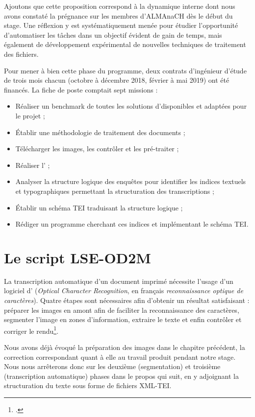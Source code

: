 Ajoutons que cette proposition correspond à la dynamique interne dont nous avons constaté la prégnance sur les membres d'ALMAnaCH dès le début du stage. Une réflexion y est systématiquement menée pour étudier l'opportunité d'automatiser les tâches dans un objectif évident de gain de temps, mais également de développement expérimental de nouvelles techniques de traitement des fichiers.

Pour mener à bien cette phase du programme, deux contrats d'ingénieur d'étude de trois mois chacun (octobre à décembre 2018, février à mai 2019) ont été financés. La fiche de poste comptait sept missions :

\begin{itemize}
    \item Réaliser un benchmark de toutes les solutions d'\ocr disponibles et adaptées pour le projet ;
    \item Établir une méthodologie de traitement des documents ;
    \item Télécharger les images, les contrôler et les pré-traiter ;
    \item Réaliser l'\ocr{} ;
    \item Analyser la structure logique des enquêtes pour identifier les indices textuels et typographiques permettant la structuration des transcriptions ;
    \item Établir un schéma TEI traduisant la structure logique ;
    \item Rédiger un programme cherchant ces indices et implémentant le schéma TEI.
\end{itemize}

\section{Le script \textsc{LSE-OD2M}}

La transcription automatique d'un document imprimé nécessite l'usage d'un logiciel d'\ocr{} (\textit{Optical Character Recognition}, en français \textit{reconnaissance optique de caractères}). Quatre étapes sont nécessaires afin d'obtenir un résultat satisfaisant : préparer les images en amont afin de faciliter la reconnaissance des caractères, segmenter l'image en zones d'information, extraire le texte et enfin contrôler et corriger le rendu\footcite[p. 1]{karpinski}.

Nous avons déjà évoqué la préparation des images dans le chapitre précédent, la correction correspondant quant à elle au travail produit pendant notre stage. Nous nous arrêterons donc sur les deuxième (segmentation) et troisième (transcription automatique) phases dans le propos qui suit, en y adjoignant la structuration du texte sous forme de fichiers XML-TEI.

